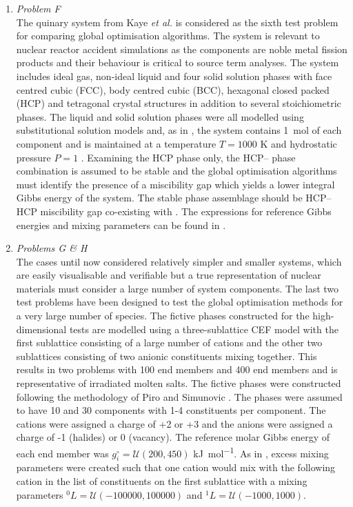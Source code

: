 \begin{enumerate}
	\item	\emph{Problem F}\\
		The quinary  system from Kaye \textit {et al.} \cite{Kaye07} is considered as the sixth test problem for comparing global optimisation algorithms. The system is relevant to nuclear reactor accident simulations as the components are noble metal fission products and their behaviour is critical to source term analyses. The system includes ideal gas, non-ideal liquid and four solid solution phases with face centred cubic (FCC), body centred cubic (BCC), hexagonal closed packed (HCP) and tetragonal crystal structures in addition to several stoichiometric phases. The liquid and solid solution phases were all modelled using substitutional solution models and, as in \cite{Piro16}, the system contains \SI{1}{\mole} of each component and is maintained at a temperature $T = 1000$ \si{\kelvin} and hydrostatic pressure $P=1$ \si{\atmosphere}. Examining the HCP phase only, the HCP-- phase combination is assumed to be stable and the global optimisation algorithms must identify the presence of a miscibility gap which yields a lower integral Gibbs energy of the system. The stable phase assemblage should be HCP--HCP miscibility gap co-existing with . The expressions for reference Gibbs energies and mixing parameters can be found in \cite{Kaye07}.
	
	\item	\emph{Problems G \& H}\\
		The cases until now considered relatively simpler and smaller systems, which are easily visualisable and verifiable but a true representation of nuclear materials must consider a large number of system components. The last two test problems have been designed to test the global optimisation methods for a very large number of species. The fictive phases constructed for the high-dimensional tests are modelled using a three-sublattice CEF model with the first sublattice consisting of a large number of cations and the other two sublattices consisting of two anionic constituents mixing together. This results in two problems with 100 end members and 400 end members and is representative of irradiated molten salts. The fictive phases were constructed following the methodology of Piro and Simunovic \cite{Piro16}. The phases were assumed to have 10 and 30 components with 1-4 constituents per component. The cations were assigned a charge of +2 or +3 and the anions were assigned a charge of -1 (halides) or 0 (vacancy). The reference molar Gibbs energy of each end member was $g_i^\circ = \mathcal{U}(200, 450)$ \si{\kilo \joule \per \mole}. As in \cite{Piro16}, excess mixing parameters were created such that one cation would mix with the following cation in the list of constituents on the first sublattice with a mixing parameters ${^0}L = \mathcal{U}(-100000, 100000)$ and ${^1}L = \mathcal{U}(-1000, 1000)$.			
	\end{enumerate}

